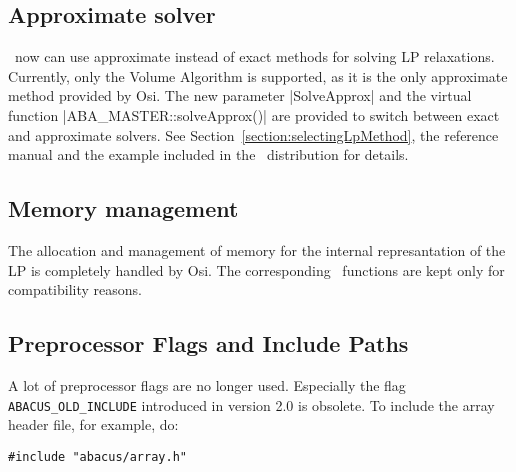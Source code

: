 \subsection{Approximate solver}

\ABACUS\ now can use approximate instead of exact methods for solving LP relaxations. Currently, only the Volume Algorithm is supported, as it is the only approximate method provided by Osi. 
The new parameter |SolveApprox| and the virtual function |ABA\_MASTER::solveApprox()| are provided to switch between exact and approximate solvers. 
See Section~\ref{section:selectingLpMethod}, the reference manual and the example 
included in the \ABACUS\ distribution for details.

\subsection{Memory management}

The allocation and management of memory for the internal represantation of the LP is completely handled by Osi. The corresponding \ABACUS\ functions are kept only for compatibility reasons.

\subsection{Preprocessor Flags and Include Paths}

A lot of preprocessor flags are no longer used. Especially the flag 
{\tt ABACUS\_OLD\_INCLUDE} introduced in version 2.0 is obsolete.
To include the array header file, for example, do:
\begin{verbatim}
#include "abacus/array.h"
\end{verbatim}
